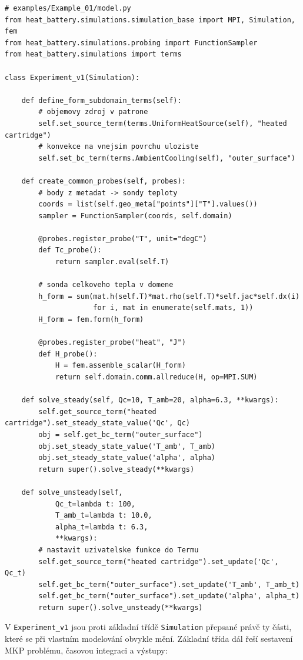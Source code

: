 \documentclass[a4paper,11pt]{article}
\begin{document}
\begin{lstlisting}[style=py]
# examples/Example_01/model.py
from heat_battery.simulations.simulation_base import MPI, Simulation, fem
from heat_battery.simulations.probing import FunctionSampler
from heat_battery.simulations import terms

class Experiment_v1(Simulation):

    def define_form_subdomain_terms(self):
        # objemovy zdroj v patrone
        self.set_source_term(terms.UniformHeatSource(self), "heated cartridge")
        # konvekce na vnejsim povrchu uloziste
        self.set_bc_term(terms.AmbientCooling(self), "outer_surface")

    def create_common_probes(self, probes):
        # body z metadat -> sondy teploty
        coords = list(self.geo_meta["points"]["T"].values())
        sampler = FunctionSampler(coords, self.domain)

        @probes.register_probe("T", unit="degC")
        def Tc_probe():
            return sampler.eval(self.T)

        # sonda celkoveho tepla v domene
        h_form = sum(mat.h(self.T)*mat.rho(self.T)*self.jac*self.dx(i)
                     for i, mat in enumerate(self.mats, 1))
        H_form = fem.form(h_form)

        @probes.register_probe("heat", "J")
        def H_probe():
            H = fem.assemble_scalar(H_form)
            return self.domain.comm.allreduce(H, op=MPI.SUM)

    def solve_steady(self, Qc=10, T_amb=20, alpha=6.3, **kwargs):
        self.get_source_term("heated cartridge").set_steady_state_value('Qc', Qc)
        obj = self.get_bc_term("outer_surface")
        obj.set_steady_state_value('T_amb', T_amb)
        obj.set_steady_state_value('alpha', alpha)
        return super().solve_steady(**kwargs)

    def solve_unsteady(self,
            Qc_t=lambda t: 100,
            T_amb_t=lambda t: 10.0,
            alpha_t=lambda t: 6.3,
            **kwargs):
        # nastavit uzivatelske funkce do Termu
        self.get_source_term("heated cartridge").set_update('Qc', Qc_t)
        self.get_bc_term("outer_surface").set_update('T_amb', T_amb_t)
        self.get_bc_term("outer_surface").set_update('alpha', alpha_t)
        return super().solve_unsteady(**kwargs)
\end{lstlisting}

V \texttt{Experiment\_v1} jsou proti základní třídě \texttt{Simulation} přepsané
právě ty části, které se při vlastním modelování obvykle mění. Základní třída
dál řeší sestavení MKP problému, časovou integraci a výstupy:
\end{document}
